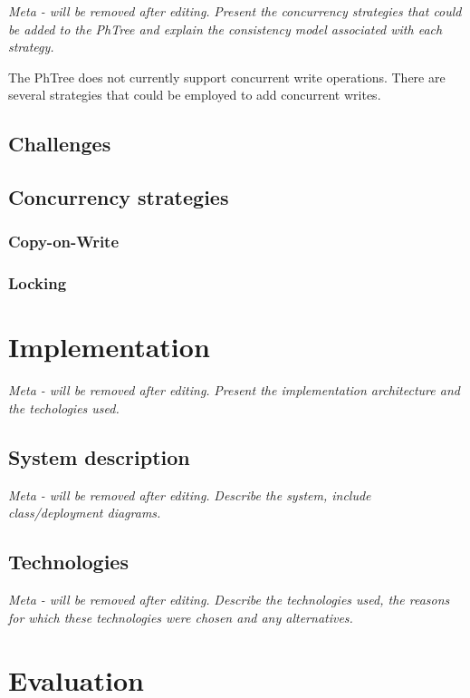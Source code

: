 \documentclass[11pt,a4paper]{globis-book}
\begin{document}
\textit{Meta - will be removed after editing.}
\textit{Present the concurrency strategies that could be added to the PhTree and explain the consistency model associated with each strategy.}

The PhTree does not currently support concurrent write operations. There are several strategies that could be employed to add concurrent writes.

\section{Challenges}

\section{Concurrency strategies}

\subsection{Copy-on-Write}

\subsection{Locking}

\chapter{Implementation}
\label{ch:implementation}

\textit{Meta - will be removed after editing.}
\textit{Present the implementation architecture and the techologies used.}

\section{System description}
\textit{Meta - will be removed after editing.}
\textit{Describe the system, include class/deployment diagrams.}

\section{Technologies}
\textit{Meta - will be removed after editing.}
\textit{Describe the technologies used, the reasons for which these technologies were chosen and any alternatives.}

\chapter{Evaluation}
\label{ch:evaluation}
\end{document}
